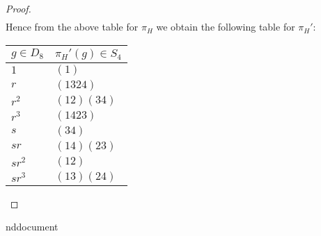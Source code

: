 \documentclass{article}
\begin{document}
\begin{enumerate}
\begin{enumerate}
\begin{proof}
\begin{align*}
          \end{align*}
          Hence from the above table for $\pi_H$ we obtain the following
          table for $\pi_H'$:
          \begin{center}
            \begin{tabular}{|l|l|}
              \hline
              $g\in D_8$ & $\pi_H'(g)\in S_4$ \\
              \hline\hline
              $1$     & $(1)$ \\
              $r$     & $(1324)$ \\
              $r^2$   & $(12)(34)$ \\
              $r^3$   & $(1423)$ \\
              $s$     & $(34)$ \\
              $sr$    & $(14)(23)$ \\
              $sr^2$  & $(12)$ \\
              $sr^3$  & $(13)(24)$ \\
              \hline
            \end{tabular}
          \end{center}
        \end{proof}
    \end{enumerate}
\end{enumerate}
\e
nd{document}
\end{document}
